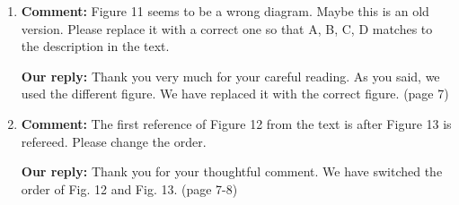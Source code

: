 \documentclass{article}
\begin{document}
\begin{enumerate}

\item \begin{flushleft}
    \textbf{Comment:}
Figure 11 seems to be a wrong diagram.
Maybe this is an old version.
Please replace it with a correct one so that A, B, C, D matches to the description in the text.
  \end{flushleft}

  \begin{flushleft}
    \textbf{Our reply:}
Thank you very much for your careful reading.
As you said, we used the different figure.
We have replaced it with the correct figure. (page 7)
  \end{flushleft}


\item \begin{flushleft}
    \textbf{Comment:}
The first reference of Figure 12 from the text is after Figure 13 is refereed.
Please change the order.
  \end{flushleft}

  \begin{flushleft}
    \textbf{Our reply:}
Thank you for your thoughtful comment.
We have switched the order of Fig. 12 and Fig. 13. (page 7-8)
  \end{flushleft}


\end{enumerate}
\end{document}
